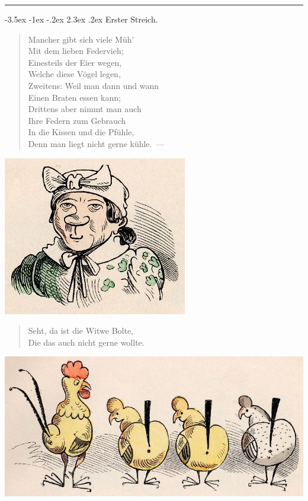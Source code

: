 \documentclass[a4paper,12pt]{article}
\makeatletter
\renewcommand\section{\@startsection {section}{1}{\z@}%
                                   {-3.5ex \@plus -1ex \@minus -.2ex}%
                                   {2.3ex \@plus.2ex}%
                                   {\centering\normalfont\LARGE\bfseries}}
\makeatother
\begin{document}
\hrule


\clearpage
\section{Erster Streich.\label{Erster_Streich}}


\begin{verse}
Mancher gibt sich viele Müh'\\{}
Mit dem lieben Federvieh;\\{}
Einesteils der Eier wegen,\\{}
Welche diese Vögel legen,\\{}
Zweitens: Weil man dann und wann\\{}
Einen Braten essen kann;\\{}
Drittens aber nimmt man auch\\{}
Ihre Federn zum Gebrauch\\{}
In die Kissen und die Pfühle,\\{}
Denn man liegt nicht gerne kühle.~—
\end{verse}



\begin{center}\includegraphics[scale=.7, alt={Witwe Bolte}]{images/1-01.jpg}\end{center}



\begin{verse}
Seht, da ist die Witwe Bolte,\\{}
Die das auch nicht gerne wollte.
\end{verse}



\begin{center}\includegraphics[scale=.7, alt={Drei Hühner und ein Hahn}]{images/1-02.jpg}\end{center}
\end{document}
